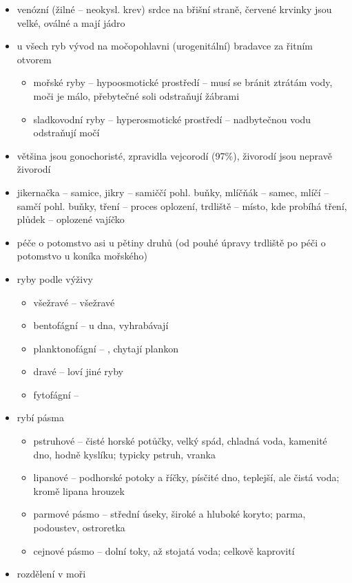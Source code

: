 \documentclass{article}
\begin{document}
\begin{itemize}
  \item venózní (žilné -- neokysl. krev) srdce na břišní straně, červené krvinky jsou velké, oválné a mají jádro
  \item u všech ryb vývod na močopohlavni (urogenitální) bradavce za řitním otvorem
  \begin{itemize}
    \item mořské ryby -- hypoosmotické prostředí -- musí se bránit ztrátám vody, moči je málo, přebytečné soli odstraňují žábrami
    \item sladkovodní ryby -- hyperosmotické prostředí -- nadbytečnou vodu odstraňují močí
  \end{itemize}
  \item většina jsou gonochoristé, zpravidla vejcorodí (97\%), živorodí jsou nepravě živorodí
  \item jikernačka -- samice, jikry -- samiččí pohl. buňky, mlíčňák -- samec, mlíčí -- samčí pohl. buňky, tření -- proces oplození, trdliště -- místo, kde probíhá tření, plůdek -- oplozené vajíčko
  \item péče o potomstvo asi u pětiny druhů (od pouhé úpravy trdliště po péči o potomstvo u koníka mořského)
  \item ryby podle výživy
  \begin{itemize}
    \item všežravé -- všežravé
    \item bentofágní -- u dna, vyhrabávají
    \item planktonofágní -- , chytají plankon
    \item dravé -- loví jiné ryby
    \item fytofágní -- 
  \end{itemize}
  \item rybí pásma
  \begin{itemize}
    \item pstruhové -- čisté horské potůčky, velký spád, chladná voda, kamenité dno, hodně kyslíku; typicky pstruh, vranka
    \item lipanové -- podhorské potoky a říčky, písčité dno, teplejší, ale čistá voda; kromě lipana hrouzek
    \item parmové pásmo -- střední úseky, široké a hluboké koryto; parma, podoustev, ostroretka
    \item cejnové pásmo -- dolní toky, až stojatá voda; celkově kaprovití
  \end{itemize}
  \item rozdělení v moři

\end{itemize}
\end{document}
